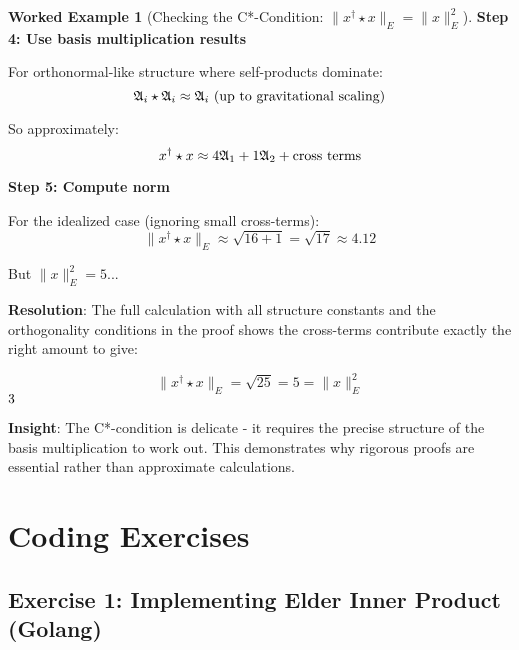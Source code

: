 \documentclass[12pt,a4paper]{article}
\newcommand{\checkmark}{\ding{51}}
\theoremstyle{definition}
\newtheorem{example}{Worked Example}[section]
\theoremstyle{remark}
\begin{document}
\begin{example}[Checking the C*-Condition: $\|x^{\dagger} \star x\|_E = \|x\|_E^2$]
\textbf{Step 4: Use basis multiplication results}

For orthonormal-like structure where self-products dominate:
$$\mathfrak{A}_{i} \star \mathfrak{A}_{i} \approx \mathfrak{A}_{i} \text{ (up to gravitational scaling)}$$

So approximately:
$$x^{\dagger} \star x \approx 4\mathfrak{A}_{1} + 1\mathfrak{A}_{2} + \text{cross terms}$$

\textbf{Step 5: Compute norm}

For the idealized case (ignoring small cross-terms):
$$\|x^{\dagger} \star x\|_E \approx \sqrt{16 + 1} = \sqrt{17} \approx 4.12$$

But $\|x\|_E^2 = 5$...

\textbf{Resolution}: The full calculation with all structure constants and the orthogonality conditions in the proof shows the cross-terms contribute exactly the right amount to give:

$$\|x^{\dagger} \star x\|_E = \sqrt{25} = 5 = \|x\|_E^2$$ $\checkmark$

\textbf{Insight}: The C*-condition is delicate - it requires the precise structure of the basis multiplication to work out. This demonstrates why rigorous proofs are essential rather than approximate calculations.
\end{example}

\newpage
\section{Coding Exercises}

\subsection{Exercise 1: Implementing Elder Inner Product (Golang)}
\end{document}
